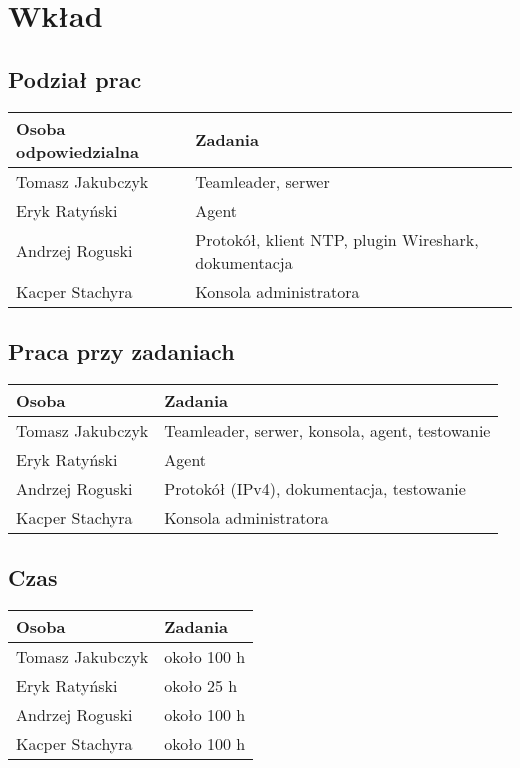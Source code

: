 \documentclass[10pt,a4paper]{article}
\begin{document}
	\section{Wkład}
	\subsection{Podział prac}
	    \begin{tabular}{ l | l }
		    \textbf{Osoba odpowiedzialna} & \textbf{Zadania} \\
		    \hline
		    Tomasz Jakubczyk  & Teamleader, serwer  \\
		    Eryk Ratyński  & Agent  \\
		    Andrzej Roguski  & Protokół, klient NTP, plugin Wireshark, dokumentacja \\
		    Kacper Stachyra & Konsola administratora \\
		\end{tabular}
		
	\subsection{Praca przy zadaniach}
        \begin{tabular}{ l | l }
		    \textbf{Osoba} & \textbf{Zadania} \\
		    \hline
		    Tomasz Jakubczyk  & Teamleader, serwer, konsola, agent, testowanie  \\
		    Eryk Ratyński  & Agent  \\
		    Andrzej Roguski  & Protokół (IPv4), dokumentacja, testowanie \\
		    Kacper Stachyra & Konsola administratora \\
		\end{tabular}
		
	\subsection{Czas}
        \begin{tabular}{ l | l }
		    \textbf{Osoba} & \textbf{Zadania} \\
		    \hline
		    Tomasz Jakubczyk  & około 100 h  \\
		    Eryk Ratyński  & około 25 h  \\
		    Andrzej Roguski  & około 100 h \\
		    Kacper Stachyra & około 100 h \\
		\end{tabular}
		
		
\end{document}
